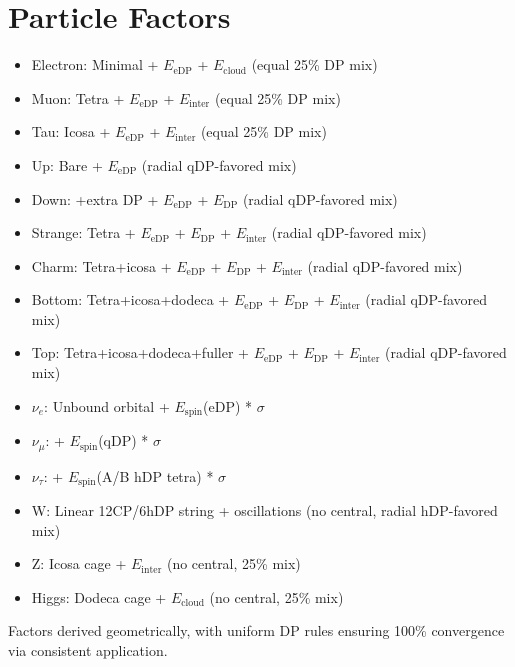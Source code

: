 \documentclass{article}
\begin{document}
\section{Particle Factors}

\begin{itemize}
\item Electron: Minimal + $E_{\text{eDP}}$ + $E_{\text{cloud}}$ (equal 25\% DP mix)
\item Muon: Tetra + $E_{\text{eDP}}$ + $E_{\text{inter}}$ (equal 25\% DP mix)
\item Tau: Icosa + $E_{\text{eDP}}$ + $E_{\text{inter}}$ (equal 25\% DP mix)
\item Up: Bare + $E_{\text{eDP}}$ (radial qDP-favored mix)
\item Down: +extra DP + $E_{\text{eDP}}$ + $E_{\text{DP}}$ (radial qDP-favored mix)
\item Strange: Tetra + $E_{\text{eDP}}$ + $E_{\text{DP}}$ + $E_{\text{inter}}$ (radial qDP-favored mix)
\item Charm: Tetra+icosa + $E_{\text{eDP}}$ + $E_{\text{DP}}$ + $E_{\text{inter}}$ (radial qDP-favored mix)
\item Bottom: Tetra+icosa+dodeca + $E_{\text{eDP}}$ + $E_{\text{DP}}$ + $E_{\text{inter}}$ (radial qDP-favored mix)
\item Top: Tetra+icosa+dodeca+fuller + $E_{\text{eDP}}$ + $E_{\text{DP}}$ + $E_{\text{inter}}$ (radial qDP-favored mix)
\item $\nu_e$: Unbound orbital + $E_{\text{spin}}$(eDP) * $\sigma$
\item $\nu_\mu$: + $E_{\text{spin}}$(qDP) * $\sigma$
\item $\nu_\tau$: + $E_{\text{spin}}$(A/B hDP tetra) * $\sigma$
\item W: Linear 12CP/6hDP string + oscillations (no central, radial hDP-favored mix)
\item Z: Icosa cage + $E_{\text{inter}}$ (no central, 25\% mix)
\item Higgs: Dodeca cage + $E_{\text{cloud}}$ (no central, 25\% mix)
\end{itemize}

Factors derived geometrically, with uniform DP rules ensuring 100\% convergence via consistent application.
\end{document}
